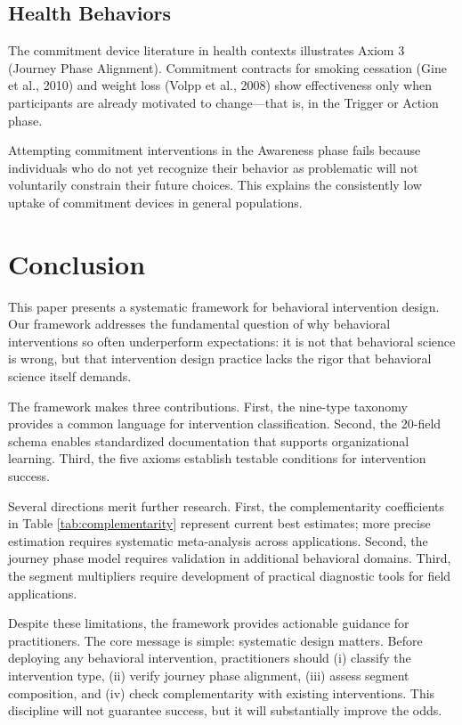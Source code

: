 \documentclass[12pt,a4paper]{article}
\begin{document}
\subsection{Health Behaviors}

The commitment device literature in health contexts illustrates Axiom 3 (Journey Phase Alignment). Commitment contracts for smoking cessation (Gine et al., 2010) and weight loss (Volpp et al., 2008) show effectiveness only when participants are already motivated to change---that is, in the Trigger or Action phase.

Attempting commitment interventions in the Awareness phase fails because individuals who do not yet recognize their behavior as problematic will not voluntarily constrain their future choices. This explains the consistently low uptake of commitment devices in general populations.


\section{Conclusion}

This paper presents a systematic framework for behavioral intervention design. Our framework addresses the fundamental question of why behavioral interventions so often underperform expectations: it is not that behavioral science is wrong, but that intervention design practice lacks the rigor that behavioral science itself demands.

The framework makes three contributions. First, the nine-type taxonomy provides a common language for intervention classification. Second, the 20-field schema enables standardized documentation that supports organizational learning. Third, the five axioms establish testable conditions for intervention success.

Several directions merit further research. First, the complementarity coefficients in Table \ref{tab:complementarity} represent current best estimates; more precise estimation requires systematic meta-analysis across applications. Second, the journey phase model requires validation in additional behavioral domains. Third, the segment multipliers require development of practical diagnostic tools for field applications.

Despite these limitations, the framework provides actionable guidance for practitioners. The core message is simple: systematic design matters. Before deploying any behavioral intervention, practitioners should (i) classify the intervention type, (ii) verify journey phase alignment, (iii) assess segment composition, and (iv) check complementarity with existing interventions. This discipline will not guarantee success, but it will substantially improve the odds.
\end{document}
